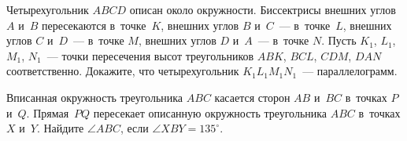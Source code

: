 \begin{problems}
\item
Четырехугольник $ABCD$ описан около окружности.
Биссектрисы внешних углов $A$ и~$B$ пересекаются в~точке~$K$,
внешних углов $B$ и~$C$~--- в~точке~$L$,
внешних углов $C$ и~$D$~--- в~точке $M$,
внешних углов $D$ и~$A$~--- в~точке $N$.
Пусть $K_{1}$, $L_{1}$, $M_{1}$, $N_{1}$~--- точки пересечения высот
треугольников $ABK$, $BCL$, $CDM$, $DAN$ соответственно.
Докажите, что четырехугольник $K_{1}L_{1}M_{1}N_{1}$~--- параллелограмм.

\item
Вписанная окружность треугольника $ABC$ касается сторон $AB$ и~$BC$ в~точках
$P$ и~$Q$.
Прямая~$PQ$ пересекает описанную окружность треугольника $ABC$ в~точках $X$
и~$Y$.
Найдите $\angle ABC$, если $\angle XBY = 135^{\circ}$.

\end{problems}

